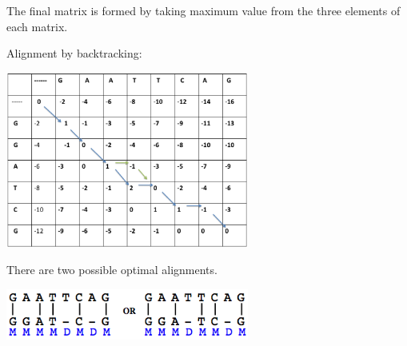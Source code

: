 \documentclass[english, a4paper,11pt]{article}
\begin{document}
The final matrix is formed by taking maximum value from the three elements of each matrix.

Alignment by backtracking:
\begin{center}
\includegraphics[width=0.6\textwidth]{Slide4.eps}
\end{center}

There are two possible optimal alignments.

\begin{center}
\includegraphics[width=0.6\textwidth]{alignment2.png}
\end{center}
\end{document}
